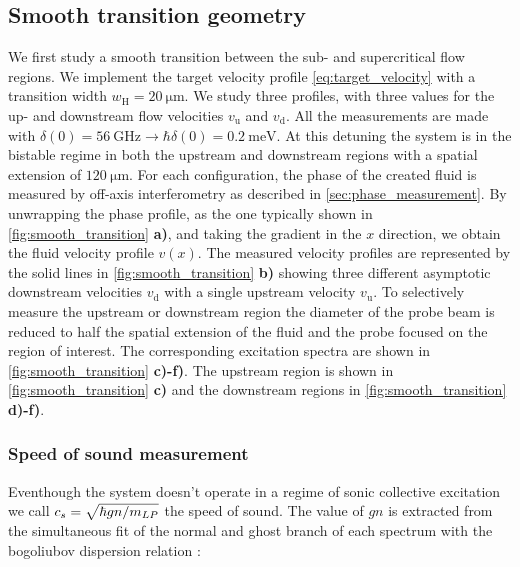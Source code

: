 \subsection{Smooth transition geometry}

We first study a smooth transition between the sub- and supercritical flow regions.
We implement the target velocity profile \autoref{eq:target_velocity} with a transition width $w_\mathrm{H}=\SI{20}{\micro\meter}$. 
We study three profiles, with three values for the up- and downstream flow velocities $v_\mathrm{u}$ and $v_\mathrm{d}$.
All the measurements are made with $\delta(0)=\SI{56}{\giga\hertz}\rightarrow \hbar\delta(0)= \SI{0.2}{\milli \electronvolt}$.
At this detuning the system is in the bistable regime in both the upstream and downstream regions with a spatial extension of $\SI{120}{\micro \meter}$.
For each configuration, the phase of the created fluid is measured by off-axis interferometry as described in \autoref{sec:phase_measurement}. By unwrapping the phase profile, as the one typically shown in \autoref{fig:smooth_transition} \textbf{a)}, and taking the gradient in the $x$ direction, we obtain the fluid velocity profile $v(x)$.
The measured velocity profiles are represented by the solid lines in \autoref{fig:smooth_transition} \textbf{b)} showing three different asymptotic downstream velocities $v_\mathrm{d}$ with a single upstream velocity $v_\mathrm{u}$. 
To selectively measure the upstream or downstream region the diameter of the probe beam is reduced to half the spatial extension of the fluid and the probe focused on the region of interest. The corresponding excitation spectra are shown in \autoref{fig:smooth_transition} \textbf{c)-f)}. 
The upstream region is shown in \autoref{fig:smooth_transition} \textbf{c)} and the downstream regions in \autoref{fig:smooth_transition} \textbf{d)-f)}.

\bigskip

\subsubsection{Speed of sound measurement} Eventhough the system doesn't operate in a regime of sonic collective excitation we call $c_s=\sqrt{\hbar g n/m_{LP}}$ the speed of sound. The value of $gn$ is extracted 
from the simultaneous fit of the normal and ghost branch of each spectrum with the bogoliubov dispersion relation :

